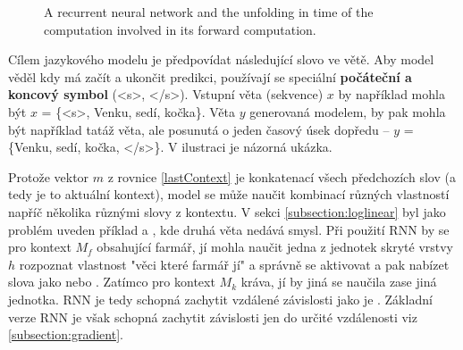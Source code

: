 \begin{figure}[h]
    \begin{center}
    \end{center}
	\caption{A recurrent neural network and the unfolding in time of the computation involved in its forward computation. }
	\label{img:rnn}
\end{figure}

Cílem jazykového modelu je předpovídat následující slovo ve větě. Aby model věděl kdy má začít a ukončit predikci, používají se speciální \textbf{počáteční a koncový symbol} (<s>, </s>). Vstupní věta (sekvence) $x$ by například mohla být $x$ = \{<s>, Venku, sedí, kočka\}. Věta $y$ generovaná modelem, by pak mohla být například tatáž věta, ale posunutá o jeden časový úsek dopředu -- $y$ = \{Venku, sedí, kočka, </s>\}. V ilustraci  je názorná ukázka.

\begin{figure}
    \begin{center}
    \end{center}
	\caption{}
	\label{img:TODO}
\end{figure}



Protože vektor $m$ z rovnice \ref{lastContext} je konkatenací všech předchozích slov (a tedy je to aktuální kontext), model se může naučit kombinací různých vlastností napříč několika různými slovy z kontextu. V sekci \ref{subsection:loglinear} byl jako problém uveden příklad  a , kde druhá věta nedává smysl. Při použití RNN by se pro kontext $M_f$ obsahující {farmář, jí} mohla naučit jedna z jednotek skryté vrstvy $h$ rozpoznat vlastnost "věci které farmář jí" a správně se aktivovat a pak nabízet slova jako  nebo . Zatímco pro kontext $M_k$ {kráva, jí} by jiná se naučila zase jiná jednotka. RNN je tedy schopná zachytit vzdálené závislosti jako je . Základní verze RNN je však schopná zachytit závislosti jen do určité vzdálenosti viz \ref{subsection:gradient}.


